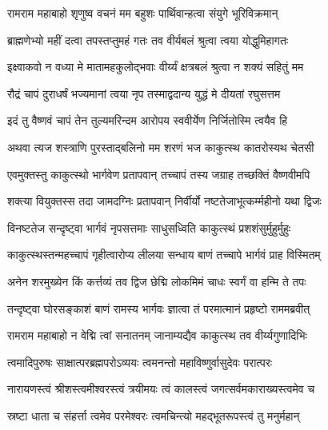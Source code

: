 
\twolineshloka
{रामराम महाबाहो शृणुष्व वचनं मम}
{बहुशः पार्थिवान्हत्वा संयुगे भूरिविक्रमान्}%

\twolineshloka
{ब्राह्मणेभ्यो महीं दत्वा तपस्तप्तुमहं गतः}
{तव वीर्यबलं श्रुत्वा त्वया योद्धुमिहागतः}%

\twolineshloka
{इक्ष्वाकवो न वध्या मे मातामहकुलोद्भवाः}
{वीर्य्यं क्षत्रबलं श्रुत्वा न शक्यं सहितुं मम}%

\twolineshloka
{रौद्रं चापं दुराधर्षं भज्यमानां त्वया नृप}
{तस्माद्वदान्य युद्धं मे दीयतां रघुसत्तम}%

\twolineshloka
{इदं तु वैष्णवं चापं तेन तुल्यमरिन्दम}
{आरोपय स्ववीर्येण निर्जितोस्मि त्वयैव हि}%

\twolineshloka
{अथवा त्यज शस्त्राणि पुरस्ताद्बलिनो मम}
{शरणं भज काकुत्स्थ कातरोस्यथ चेतसी}%


\twolineshloka
{एवमुक्तस्तु काकुत्स्थो भार्गवेण प्रतापवान्}
{तच्चापं तस्य जग्राह तच्छक्तिं वैष्णवीमपि}%

\twolineshloka
{शक्त्या वियुक्तस्स तदा जामदग्निः प्रतापवान्}
{निर्वीर्यो नष्टतेजाभूत्कर्म्महीनो यथा द्विजः}%

\twolineshloka
{विनष्टतेज सन्दृष्ट्वा भार्गवं नृपसत्तमाः}
{साधुसध्विति काकुत्स्थं प्रशशंसुर्मुहुर्मुहुः}%

\twolineshloka
{काकुत्स्थस्तन्महच्चापं गृहीत्वारोप्य लीलया}
{सन्धाय बाणं तच्चापे भार्गवं प्राह विस्मितम्}%


\twolineshloka
{अनेन शरमुख्येन किं कर्त्तव्यं तव द्विज}
{छेद्मि लोकमिमं चाधः स्वर्गं वा हन्मि ते तपः}%


\twolineshloka
{तन्दृष्ट्वा घोरसङ्काशं बाणं रामस्य भार्गवः}
{ज्ञात्वा तं परमात्मानं प्रहृष्टो राममब्रवीत्}%


\twolineshloka
{रामराम महाबाहो न वेद्मि त्वां सनातनम्}
{जानाम्यद्यैव काकुत्स्थ तव वीर्य्यगुणादिभिः}%

\twolineshloka
{त्वमादिपुरुषः साक्षात्परब्रह्मपरोऽव्ययः}
{त्वमनन्तो महाविष्णुर्वासुदेवः परात्परः}%

\twolineshloka
{नारायणस्त्वं श्रीशस्त्वमीश्वरस्त्वं त्रयीमयः}
{त्वं कालस्त्वं जगत्सर्वमकाराख्यस्त्वमेव च}%

\twolineshloka
{स्रष्टा धाता च संहर्त्ता त्वमेव परमेश्वरः}
{त्वमचिन्त्यो महद्भूतरूपस्त्वं तु मनुर्महान्}%

